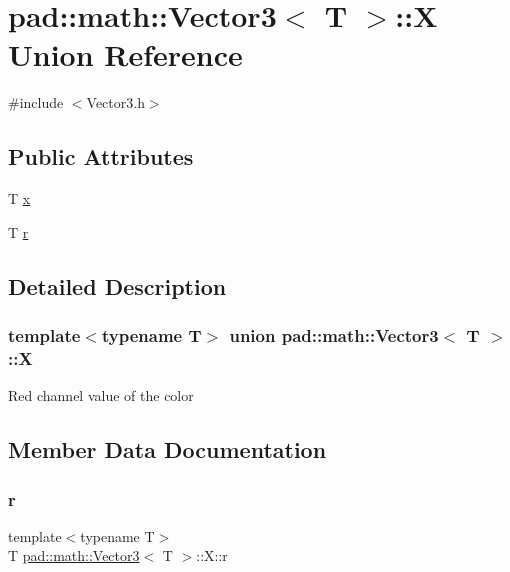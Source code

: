 \hypertarget{unionpad_1_1math_1_1_vector3_1_1_x}{}\section{pad\+:\+:math\+:\+:Vector3$<$ T $>$\+:\+:X Union Reference}
\label{unionpad_1_1math_1_1_vector3_1_1_x}


{\ttfamily \#include $<$Vector3.\+h$>$}

\subsection*{Public Attributes}
\begin{DoxyCompactItemize}
\item 
T \mbox{\hyperlink{unionpad_1_1math_1_1_vector3_1_1_x_a9332c00a4e6cfe6d551f499ef424a7b0}{x}}
\item 
T \mbox{\hyperlink{unionpad_1_1math_1_1_vector3_1_1_x_a871f7dbba9559aacf21ce2e3549c97bb}{r}}
\end{DoxyCompactItemize}


\subsection{Detailed Description}
\subsubsection*{template$<$typename T$>$\newline
union pad\+::math\+::\+Vector3$<$ T $>$\+::X}

Red channel value of the color 

\subsection{Member Data Documentation}
\mbox{\label{unionpad_1_1math_1_1_vector3_1_1_x_a871f7dbba9559aacf21ce2e3549c97bb}} 
\subsubsection{\texorpdfstring{r}{r}}
{\footnotesize\ttfamily template$<$typename T$>$ \\
T \mbox{\hyperlink{structpad_1_1math_1_1_vector3}{pad\+::math\+::\+Vector3}}$<$ T $>$\+::X\+::r}

